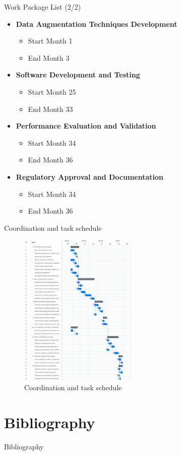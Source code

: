 \documentclass{beamer}
\begin{document}
\begin{frame}{Work Package List (2/2)}
  \begin{itemize}
    \item \textbf{Data Augmentation Techniques Development}
    \begin{itemize}
      \item Start Month 1
      \item End Month 3
    \end{itemize}
    
    \item \textbf{Software Development and Testing}
    \begin{itemize}
      \item Start Month 25
      \item End Month 33
    \end{itemize}
    
    \item \textbf{Performance Evaluation and Validation}
    \begin{itemize}
      \item Start Month 34
      \item End Month 36
    \end{itemize}
    
    \item \textbf{Regulatory Approval and Documentation}
    \begin{itemize}
      \item Start Month 34
      \item End Month 36
    \end{itemize}
  \end{itemize}
\end{frame}


\begin{frame}{Coordination and task schedule}

  \begin{figure}
      \includegraphics[width = 0.5\textwidth]{fig/tasks.png}
      \caption{Coordination and task schedule}
  \end{figure}
  
  \end{frame}

\section{Bibliography}

\begin{frame}[allowframebreaks]{Bibliography}




\end{frame}
\end{document}
